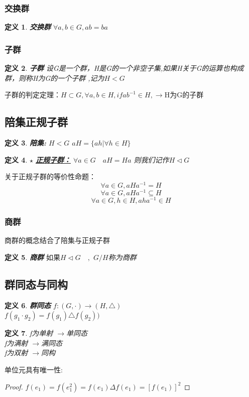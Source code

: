 \documentclass{report}
\newtheorem{proof}{证明}[section]
\newtheorem{definition}{定义}
\begin{document}
\subsubsection{交换群}
 \begin{definition}\textbf{交换群}
 $\forall a,b \in G,ab=ba$
  \end{definition}
\subsubsection{子群}
 \begin{definition}\textbf{子群}
\noindent 设G是一个群，H是G的一个非空子集,如果H关于G的运算也构成群，则称H为G的一个子群 ,记为$H<G$
 \end{definition}
子群的判定定理：$H\subset G,\forall a,b \in H,if ab^{-1} \in H,\rightarrow$H为G的子群
\subsection{陪集\quad 正规子群}
\begin{definition}\textbf{陪集:}
\noindent $H<G$ 
$a H=\{a h | \forall h \in H\}$
\end{definition}

\begin{definition}$\star$ \href{https://ncatlab.org/nlab/show/normal%20subgroup}{\textbf{正规子群：}}
\noindent $\forall a \in G \quad a H=H a$ 
则我们记作$H \triangleleft G$
\end{definition}
\begin{mdframed}[backgroundcolor=blue!7] 
\noindent 关于正规子群的等价性命题：
	$$\forall a \in G,aHa^{-1}=H$$
	$$\forall a \in G,aHa^{-1}\subseteq H$$
	$$\forall a \in G,h \in H,aha^{-1}\in H$$
\end{mdframed}
\subsubsection{商群}
\noindent 商群的概念结合了陪集与正规子群
\begin{definition}\textbf{商群}
$如果 H \triangleleft G \quad ,$
$G/H$称为商群
\end{definition}
\subsection{群同态与同构}
\begin{definition}\textbf{群同态}
\noindent $f:(G,\cdot)\rightarrow(H,\triangle)$
\\$f(g_{1}\cdot g_{2})=f(g_{1})\triangle f(g_{2}))$
\end{definition}
\begin{definition}
\noindent f为单射 $\rightarrow $单同态
\\ f为满射 $\rightarrow $满同态
\\ f为双射 $\rightarrow$同构
\end{definition}
\noindent 单位元具有唯一性: \\
\begin{proof}
	$f\left(e_{1}\right)=f\left(e_{1}^{2}\right)=f\left(e_{1}\right) \Delta f\left(e_{1}\right)=\left[f\left(e_{1}\right)\right]^{2}$
	
	\end{proof}
\end{document}
